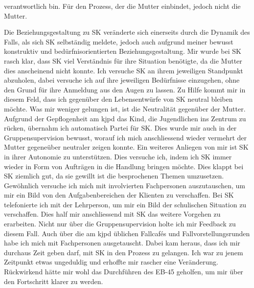 verantwortlich bin. Für den Prozess, der die Mutter einbindet, jedoch nicht die Mutter. 

Die Beziehungsgestaltung zu SK veränderte sich einerseits durch die Dynamik des Falls, als sich SK selbständig meldete, jedoch auch aufgrund meiner bewusst konstruktiv und bedürfnisorientierten Beziehungsgestaltung. Mir wurde bei SK rasch klar, dass SK viel Verständnis für ihre Situation benötigte, da die Mutter dies anscheinend nicht konnte. Ich versuche SK an ihrem jeweiligen Standpunkt abzuholen, dabei versuche ich auf ihre jeweiligen Bedürfnisse einzugehen, ohne den Grund für ihre Anmeldung aus den Augen zu lassen. Zu Hilfe kommt mir in diesem Feld, dass ich gegenüber den Lebensentwürfe von SK neutral bleiben möchte. Was mir weniger gelungen ist, ist die Neutralität gegenüber der Mutter. Aufgrund der Gepflogenheit am \ac{kjpd} das Kind, die Jugendlichen ins Zentrum zu rücken, übernahm ich automatisch Partei für SK. Dies wurde mir auch in der Gruppensupervision bewusst, worauf ich mich anschliessend wieder vermehrt der Mutter gegeneüber neutraler zeigen konnte. Ein weiteres Anliegen von mir ist SK in ihrer Autonomie zu unterstützen. Dies versuche ich, indem ich SK immer wieder in Form von Aufträgen in die Handlung bringen möchte. Dies klappt bei SK ziemlich gut, da sie gewillt ist die besprochenen Themen umzusetzen. Gewöhnlich versuche ich mich mit involvierten Fachpersonen auszutauschen, um mir ein Bild von den Aufgabenbereichen der Klienten zu verschaffen. Bei SK telefonierte ich mit der Lehrperson, um mir ein Bild der schulischen Situation zu verschaffen. Dies half mir anschliessend mit SK das weitere Vorgehen zu erarbeiten. Nicht nur über die Gruppensupervision holte ich mir Feedback zu diesem Fall. Auch über die am \ac{kjpd} üblichen Fallcafés und Fallvorstellungsrunden habe ich mich mit Fachpersonen ausgetauscht. Dabei kam heraus, dass ich mir durchaus Zeit geben darf, mit SK in den Prozess zu gelangen. Ich war zu jenem Zeitpunkt etwas ungeduldig und erhoffte mir rascher eine Veränderung. Rückwirkend hätte mir wohl das Durchführen des EB-45 geholfen, um mir über den Fortschritt klarer zu werden. 

